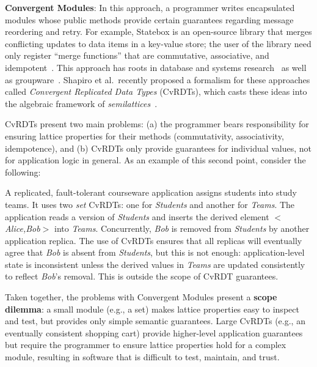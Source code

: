 \vspace{0.5em}\noindent
\textbf{Convergent Modules}: In this approach, a programmer writes encapsulated
modules whose public methods provide certain guarantees regarding message
reordering and retry. For example, Statebox is an open-source library that
merges conflicting updates to data items in a key-value store; the user of the
library need only register ``merge functions'' that are commutative,
associative, and idempotent~\cite{statebox}. This approach has roots in database
and systems research~\cite{Farrag1989,Garcia-Molina1983,Helland2009,O'Neil1986,Terry1995} as
well as groupware~\cite{Ellis1989,Sun1998}.  Shapiro et al.\ recently proposed a
formalism for these approaches called \emph{Convergent Replicated Data Types}
(CvRDTs), which casts these ideas into the algebraic framework of
\emph{semilattices}~\cite{Shapiro2011a,Shapiro2011b}.

CvRDTs present two main problems: (a) the programmer bears responsibility for
ensuring lattice properties for their methods (commutativity, associativity,
idempotence), and (b) CvRDTs only provide guarantees for individual values, not
for application logic in general. As an example of this second point, consider
the following:

\vspace{-0.25em}
\begin{example}
A replicated, fault-tolerant courseware application assigns students into study teams.  It uses two \emph{set} CvRDTs: one for \emph{Students} and another for \emph{Teams}.  The application reads a version of \emph{Students} and inserts the derived element $<$\emph{Alice,Bob}$>$ into \emph{Teams}. Concurrently, \emph{Bob} is removed from
\emph{Students} by another application replica. The use of CvRDTs ensures that all replicas will
eventually agree that \emph{Bob} is absent from \emph{Students}, but this is not enough: application-level state
is inconsistent unless the derived values in \emph{Teams} are updated consistently to reflect \emph{Bob}'s
removal.  This is outside the scope of CvRDT guarantees.
\end{example}

\vspace{-.25em}
Taken together, the problems with Convergent Modules present a {\bf scope
  dilemma}: a small module (e.g., a set) makes lattice properties easy to
inspect and test, but provides only simple semantic guarantees. Large CvRDTs
(e.g., an eventually consistent shopping cart) provide higher-level application
guarantees but require the programmer to ensure lattice properties hold for a
complex module, resulting in software that is difficult to test, maintain, and
trust.
% 

